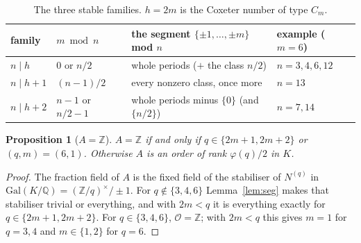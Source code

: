 \documentclass[11pt,a4paper]{article}
\newtheorem{proposition}[theorem]{Proposition}
\theoremstyle{definition}
\newcommand{\ZZ}{\mathbb{Z}}
\newcommand{\QQ}{\mathbb{Q}}
\newcommand{\cO}{\mathcal{O}}
\begin{document}
\begin{table}[htbp]
\centering\small
{}
\begin{tabular}{llll}
\toprule
family & $m \bmod n$ & the segment $\{\pm1,\dots,\pm m\}$ mod $n$ & example ($m=6$) \\
\midrule
$n\mid h$ & $0$ or $n/2$ & whole periods ($+$ the class $n/2$) & $n=3,4,6,12$ \\
$n\mid h+1$ & $(n-1)/2$ & every nonzero class, once more & $n=13$ \\
$n\mid h+2$ & $n-1$ or $n/2-1$ & whole periods minus $\{0\}$ (and $\{n/2\}$) & $n=7,14$ \\
\bottomrule
\end{tabular}
\caption{The three stable families. $h=2m$ is the Coxeter number of type $C_m$.}
\label{tab:familias}
\end{table}

\begin{proposition}[$A=\ZZ$]\label{prop:AZ}
$A=\ZZ$ if and only if $q\in\{2m+1,2m+2\}$ or $(q,m)=(6,1)$. Otherwise $A$ is an order of rank $\varphi(q)/2$
in $K$.
\end{proposition}

\begin{proof}
The fraction field of $A$ is the fixed field of the stabiliser of $N^{(q)}$ in
$\mathrm{Gal}(K/\QQ)=(\ZZ/q)^\times/\pm1$. For $q\notin\{3,4,6\}$ Lemma~\ref{lem:seg} makes that stabiliser
trivial or everything, and with $2m<q$ it is everything exactly for $q\in\{2m+1,2m+2\}$. For
$q\in\{3,4,6\}$, $\cO=\ZZ$; with $2m<q$ this gives $m=1$ for $q=3,4$ and $m\in\{1,2\}$ for $q=6$.
\end{proof}
\end{document}
